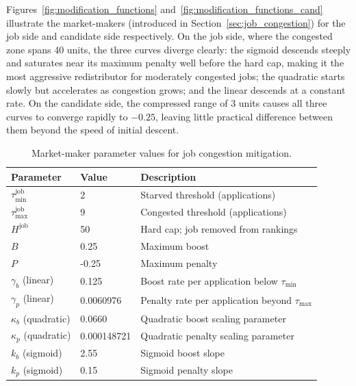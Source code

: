 Figures~\ref{fig:modification_functions} and~\ref{fig:modification_functions_cand}
illustrate the market-makers (introduced in Section~\ref{sec:job_congestion}) for the job side and candidate side
respectively. On the job side, where the congested zone spans 40 units, the
three curves diverge clearly: the sigmoid descends steeply and saturates near
its maximum penalty well before the hard cap, making it the most aggressive
redistributor for moderately congested jobs; the quadratic starts slowly but
accelerates as congestion grows; and the linear descends at a constant rate. On the candidate side,
the compressed range of 3 units causes all three curves to converge rapidly
to $-0.25$, leaving little practical difference between them beyond the speed
of initial descent. 

\begin{table}[htbp]
    \centering
    \caption{Market-maker parameter values for job congestion mitigation.}
    \label{tab:job_mm_params}
    \begin{tabular}{@{}llp{7.5cm}@{}}
        \toprule
        \textbf{Parameter} & \textbf{Value} & \textbf{Description} \\
        \midrule
        $\tau_{\min}^{\text{job}}$ & 2         & Starved threshold (applications) \\
        $\tau_{\max}^{\text{job}}$ & 9         & Congested threshold (applications) \\
        $H^{\text{job}}$           & 50        & Hard cap; job removed from rankings \\
        $B$                        & 0.25      & Maximum boost \\
        $P$                        & -0.25      & Maximum penalty \\
        $\gamma_b$ (linear)        & 0.125     & Boost rate per application below $\tau_{\min}$ \\
        $\gamma_p$ (linear)        & 0.0060976     & Penalty rate per application beyond $\tau_{\max}$ \\
        $\kappa_b$ (quadratic)     & 0.0660     & Quadratic boost scaling parameter \\
        $\kappa_p$ (quadratic)     & 0.000148721  & Quadratic penalty scaling parameter \\
        $k_b$ (sigmoid)            & 2.55      & Sigmoid boost slope \\
        $k_p$ (sigmoid)            & 0.15      & Sigmoid penalty slope \\
        \bottomrule
    \end{tabular}
\end{table}

